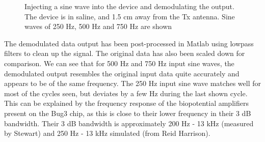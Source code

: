 \documentclass[12pt,onecolumn,titlepage]{article}
\begin{document}
\begin{figure}[htbp]
	\centering
		\quad
		\quad
	\label{fig:sine_1p5cm_saline_demod_compare}
	\caption{Injecting a sine wave into the device and demodulating the output. The device is in saline, and 1.5 cm away from the Tx antenna. Sine waves of 250 Hz, 500 Hz and 750 Hz are shown}
\end{figure}


The demodulated data output has been post-processed in Matlab using lowpass filters to clean up the signal. The original data has also been scaled down for comparison. We can see that for 500 Hz and 750 Hz input sine waves, the demodulated output resembles the original input data quite accurately and appears to be of the same frequency. The 250 Hz input sine wave matches well for most of the cycles seen, but deviates by a few Hz during the last shown cycle. This can be explained by the frequency response of the biopotential amplifiers present on the Bug3 chip, as this is close to their lower frequency in their 3 dB bandwidth. Their 3 dB bandwidth is approximately 200 Hz - 13 kHz (measured by Stewart) and 250 Hz - 13 kHz simulated (from Reid Harrison). 
\end{document}
